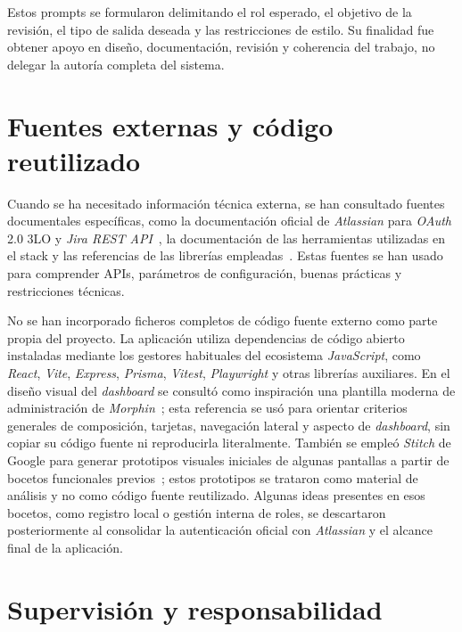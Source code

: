 \begin{refsection}
Estos prompts se formularon delimitando el rol esperado, el objetivo de la revisión, el tipo de salida deseada y las restricciones de estilo. Su finalidad fue obtener apoyo en diseño, documentación, revisión y coherencia del trabajo, no delegar la autoría completa del sistema.


\section{Fuentes externas y código reutilizado}

Cuando se ha necesitado información técnica externa, se han consultado fuentes documentales específicas, como la documentación oficial de \textit{Atlassian} para \textit{OAuth} 2.0 3LO y \textit{Jira REST API}~\cite{AtlassianOAuth3LO,AtlassianJiraRestV3}, la documentación de las herramientas utilizadas en el stack y las referencias de las librerías empleadas~\cite{ReactDocs,ViteDocs,NodeDocs,ExpressDocs,PrismaDocs,DockerComposeDocs}. Estas fuentes se han usado para comprender APIs, parámetros de configuración, buenas prácticas y restricciones técnicas.

No se han incorporado ficheros completos de código fuente externo como parte propia del proyecto. La aplicación utiliza dependencias de código abierto instaladas mediante los gestores habituales del ecosistema \textit{JavaScript}, como \textit{React}, \textit{Vite}, \textit{Express}, \textit{Prisma}, \textit{Vitest}, \textit{Playwright} y otras librerías auxiliares. En el diseño visual del \textit{dashboard} se consultó como inspiración una plantilla moderna de administración de \textit{Morphin}~\cite{MorphinDashboardInspiration}; esta referencia se usó para orientar criterios generales de composición, tarjetas, navegación lateral y aspecto de \textit{dashboard}, sin copiar su código fuente ni reproducirla literalmente. También se empleó \textit{Stitch} de Google para generar prototipos visuales iniciales de algunas pantallas a partir de bocetos funcionales previos~\cite{GoogleStitch}; estos prototipos se trataron como material de análisis y no como código fuente reutilizado. Algunas ideas presentes en esos bocetos, como registro local o gestión interna de roles, se descartaron posteriormente al consolidar la autenticación oficial con \textit{Atlassian} y el alcance final de la aplicación.

\section{Supervisión y responsabilidad}


\end{refsection}
